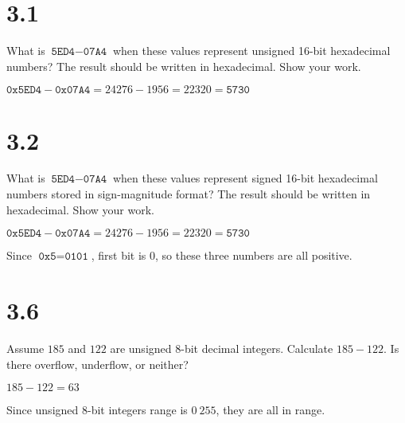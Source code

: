\documentclass[paper=a4, fontsize=11pt]{scrartcl} %
\begin{document}
\section{3.1}

\begin{fancyquotes}
  What is $\texttt{5ED4} - \texttt{07A4}$ when these values represent unsigned 16-bit hexadecimal numbers? The result should be written in hexadecimal. Show your work.
\end{fancyquotes}

$\texttt{0x5ED4} - \texttt{0x07A4} = 24276 - 1956 = 22320 = \texttt{5730}$


\section{3.2}

\begin{fancyquotes}
  What is $\texttt{5ED4} - \texttt{07A4}$ when these values represent signed 16-bit hexadecimal numbers stored in sign-magnitude format? The result should be written in hexadecimal. Show your work.
\end{fancyquotes}

$\texttt{0x5ED4} - \texttt{0x07A4} = 24276 - 1956 = 22320 = \texttt{5730}$

Since $\texttt{0x5} = \texttt{0101}$, first bit is $0$, so these three numbers are all positive.

\section{3.6}

\begin{fancyquotes}
  Assume $185$ and $122$ are unsigned 8-bit decimal integers. Calculate $185-122$. Is there overflow, underflow, or neither?
\end{fancyquotes}

$185 - 122 = 63$

Since unsigned 8-bit integers range is $0~255$, they are all in range.


\end{document}

